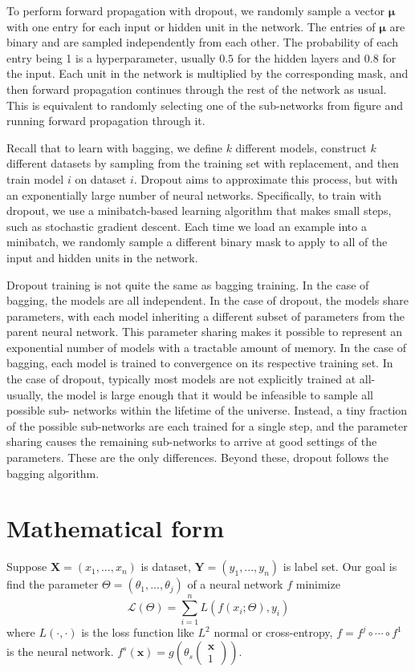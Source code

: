 To perform forward propagation with dropout, we randomly sample a vector $\bm \mu$ with one entry for each input
or hidden unit in the network. The entries of $\bm \mu$ are binary and are sampled independently from each other. The probability of each entry being 1 is a hyperparameter, usually $0.5$ for the hidden layers and $0.8$ for the input. Each unit in the network is multiplied by the corresponding mask, and then forward propagation continues through the rest of the	network as usual. This is equivalent to randomly selecting one of the sub-networks from figure and running forward propagation through it.

Recall that to learn with bagging, we define $k$ different models, construct $k$ different datasets by sampling from the training set with replacement, and then train model $i$ on dataset $i$. Dropout aims to approximate this process, but with an exponentially large number of neural networks. Specifically, to train with dropout, we use a minibatch-based learning algorithm that makes small steps, such as stochastic gradient descent. Each time we load an example into a minibatch, we randomly sample a different binary mask to apply to all of the input and hidden units in the network.

Dropout training is not quite the same as bagging training. In the case of
bagging, the models are all independent. In the case of dropout, the models share
parameters, with each model inheriting a different subset of parameters from the
parent neural network. This parameter sharing makes it possible to represent an
exponential number of models with a tractable amount of memory. In the case of
bagging, each model is trained to convergence on its respective training set. In the
case of dropout, typically most models are not explicitly trained at all-usually,
the model is large enough that it would be infeasible to sample all possible sub-
networks within the lifetime of the universe. Instead, a tiny fraction of the possible
sub-networks are each trained for a single step, and the parameter sharing causes
the remaining sub-networks to arrive at good settings of the parameters. These
are the only differences. Beyond these, dropout follows the bagging algorithm.




\section{Mathematical form}

Suppose $\mathbf X=(x_1,...,x_n)$ is dataset, $\mathbf Y=(y_1,...,y_n)$ is label set. Our goal is find the parameter $\Theta=(\theta_1,...,\theta_j)$ of a neural network $f$ minimize
\begin{equation}\label{1}
\mathcal L(\Theta)=\sum_{i=1}^n L(f(x_i;\Theta),y_i)
\end{equation}
where $L(\cdot, \cdot)$ is the loss function like $L^2$ normal or cross-entropy, $f=f^j\circ\cdots\circ f^1$ is the neural network. $f^s(\mathbf x)=g(\theta_s \begin{pmatrix}
\mathbf x\\ 1
\end{pmatrix})$.

